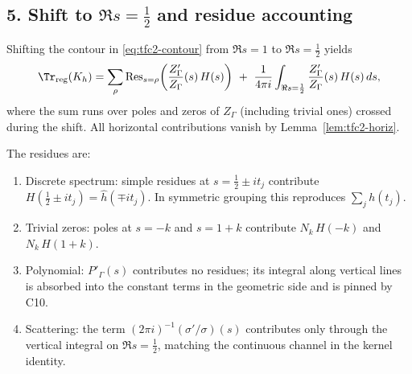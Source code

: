 \subsection*{5. Shift to $\Re s=\tfrac12$ and residue accounting}\relax\hspace{0pt}
\label{subsec:tfc2-shift} %

\begin{proposition}\relax\hspace{0pt}
\label{prop:tfc2-shift} %
Shifting the contour in \eqref{eq:tfc2-contour} from $\Re s=1$ to $\Re s=\tfrac12$ yields
\[
\Tr_{\mathrm{reg}}(K_h)=\sum_{\rho}\operatorname{Res}_{s=\rho}\!\left(\frac{Z'_\Gamma}{Z_\Gamma}(s)\,H(s)\right)\ +\ \frac{1}{4\pi i}\int_{\Re s=\frac12}\frac{Z'_\Gamma}{Z_\Gamma}(s)\,H(s)\,ds,
\]
where the sum runs over poles and zeros of $Z_\Gamma$ (including trivial ones) crossed during the shift. All horizontal contributions vanish by Lemma~\ref{lem:tfc2-horiz}.\relax\hspace{0pt}
\end{proposition}

\begin{lemma}\relax\hspace{0pt}
\label{lem:tfc2-residues} %
The residues are:
\begin{enumerate}\relax\hspace{0pt}
\item Discrete spectrum: simple residues at $s=\tfrac12\pm it_j$ contribute $H(\tfrac12\pm it_j)=\widehat{h}(\mp it_j)$. In symmetric grouping this reproduces $\sum_j h(t_j)$.\relax\hspace{0pt}
\item Trivial zeros: poles at $s=-k$ and $s=1+k$ contribute $N_k\,H(-k)$ and $N_k\,H(1+k)$.\relax\hspace{0pt}
\item Polynomial: $P'_\Gamma(s)$ contributes no residues; its integral along vertical lines is absorbed into the constant terms in the geometric side and is pinned by C10.\relax\hspace{0pt}
\item Scattering: the term $(2\pi i)^{-1}(\sigma'/\sigma)(s)$ contributes only through the vertical integral on $\Re s=\tfrac12$, matching the continuous channel in the kernel identity.\relax\hspace{0pt}
\end{enumerate}
\end{lemma}

